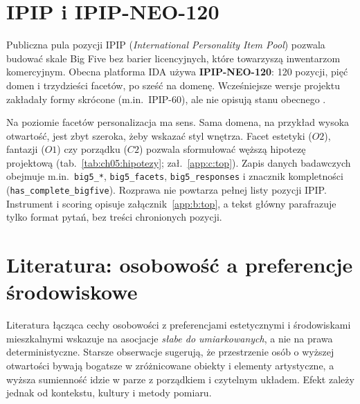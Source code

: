 \section{IPIP i IPIP-NEO-120}
\label{ch05:sec:ipip}

Publiczna pula pozycji IPIP (\emph{International Personality Item Pool}) pozwala budować skale Big Five bez barier licencyjnych, które towarzyszą inwentarzom komercyjnym.
Obecna platforma IDA używa \textbf{IPIP-NEO-120}: 120 pozycji, pięć domen i trzydzieści facetów, po sześć na domenę. Wcześniejsze wersje projektu zakładały formy skrócone (m.in.\ IPIP-60), ale nie opisują stanu obecnego \parencite{idaPlatform2026}.

Na poziomie facetów personalizacja ma sens. Sama domena, na przykład wysoka otwartość, jest zbyt szeroka, żeby wskazać styl wnętrza. Facet estetyki ($O2$), fantazji ($O1$) czy porządku ($C2$) pozwala sformułować węższą hipotezę projektową (tab.~\ref{tab:ch05:hipotezy}; zał.~\ref{app:c:top}).
Zapis danych badawczych obejmuje m.in.\ \texttt{big5\_*}, \texttt{big5\_facets}, \texttt{big5\_responses} i znacznik kompletności (\texttt{has\_complete\_bigfive}).
Rozprawa nie powtarza pełnej listy pozycji IPIP. Instrument i scoring opisuje załącznik~\ref{app:b:top}, a tekst główny parafrazuje tylko format pytań, bez treści chronionych pozycji.

\section{Literatura: osobowość a preferencje środowiskowe}
\label{ch05:sec:literatura}

Literatura łącząca cechy osobowości z preferencjami estetycznymi i środowiskami mieszkalnymi wskazuje na asocjacje \emph{słabe do umiarkowanych}, a nie na prawa deterministyczne.
Starsze obserwacje sugerują, że przestrzenie osób o wyższej otwartości bywają bogatsze w zróżnicowane obiekty i elementy artystyczne, a wyższa sumienność idzie w parze z porządkiem i czytelnym układem. Efekt zależy jednak od kontekstu, kultury i metody pomiaru.

